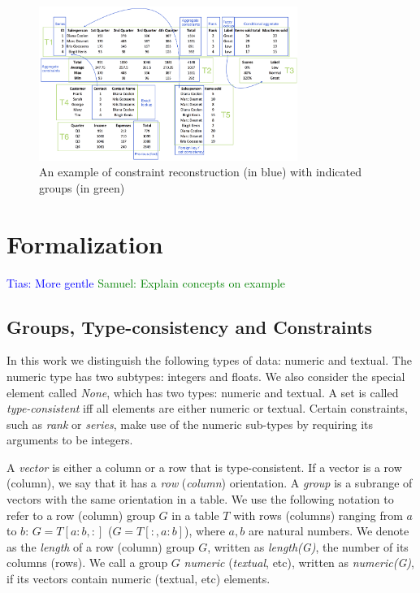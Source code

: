\documentclass{ecai}
\newcommand{\samuel}[1]{\textcolor{green}{{\sc Samuel:} #1}\xspace}
\newcommand{\tias}[1]{\textcolor{blue}{{\sc Tias:} #1}\xspace}
\begin{document}
\begin{figure}[tbh]
  \begin{center}
    \includegraphics[width=0.75\textwidth]{figures/Demo.png}
  \end{center}
  \vspace{-10pt}
  \caption{An example of constraint reconstruction (in blue) with indicated groups (in green)}
  \label{fig:main_example}
\end{figure}

\section{Formalization}
\tias{More gentle}
\samuel{Explain concepts on example}
\subsection{Groups, Type-consistency and Constraints}
In this work we distinguish the following types of data: numeric and textual. The numeric type has two subtypes: integers and floats. We also consider the special element called \textit{None}, which has two types: numeric and textual. A set is called \textit{type-consistent} iff all elements are either numeric or textual. Certain constraints, such as \textit{rank} or \textit{series}, make use of the numeric sub-types by requiring its arguments to be integers.

A \textit{vector} is either a column or a row that is type-consistent. If a vector is a row (column), we say that it has a \textit{row} (\textit{column}) orientation. A \textit{group} is a subrange of vectors with the same orientation in a table. We use the following notation to refer to a row (column) group $G$ in a table $T$ with rows (columns) ranging from $a$ to $b$: $G = T[a{:}b,:]$ ($G = T[{:},a{:}b]$), where $a,b$ are natural numbers. We denote as the \textit{length} of a row (column) group $G$, written as \textit{length(G)}, the number of its columns (rows). We call a group $G$ \textit{numeric} (\textit{textual}, etc), written as \textit{numeric(G)}, if its vectors contain numeric (textual, etc) elements.
\end{document}
